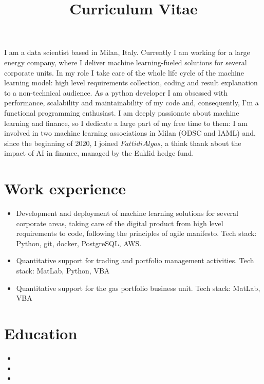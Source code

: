 \documentclass[11pt,a4paper,sans]{moderncv}        %
\title{Curriculum Vitae}                               %
\begin{document}
\makecvtitle
\small{I am a data scientist based in Milan, Italy. Currently I am working for a large energy company, where I deliver machine learning-fueled solutions for several corporate units.
In my role I take care of the whole life cycle of the machine learning model: high level requirements collection, coding and result explanation to a non-technical audience. 
As a python developer I am obsessed with performance, scalability and maintainability of my code and, consequently, I'm a functional programming enthusiast. 
I am deeply passionate about machine learning and finance, so I dedicate a large part of my free time to them: I am involved in two machine learning associations in Milan (ODSC and IAML) and, since the beginning of 2020, I joined $Fatti di Algos$, a think thank about the impact of AI in finance, managed by the Euklid hedge fund.}

\section{Work experience}

\begin{itemize}
\item{
Development and deployment of machine learning solutions for several corporate areas, taking care of the digital product from high level requirements to code, following the principles of agile manifesto. Tech stack: Python, git, docker, PostgreSQL, AWS.
}
\item{
Quantitative support for trading and portfolio management activities. Tech stack: MatLab, Python, VBA
}
\item{
Quantitative support for the gas portfolio business unit. Tech stack: MatLab, VBA}
\end{itemize}

\section{Education}
\begin{itemize}
\item{}
\item{}
\item{}
\end{itemize}
\end{document}
